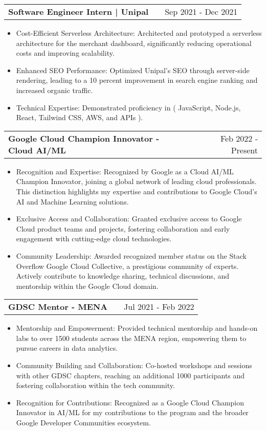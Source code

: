 \documentclass[a4paper,11pt]{article}
\makeatletter
\newenvironment{joblong}[2]
    {
    \begin{tabularx}{\linewidth}{@{}l X r@{}}
    \textbf{#1} & \hfill &  #2 \\[3.75pt]
    \end{tabularx}
    \begin{minipage}[t]{\linewidth}
    \begin{itemize}[nosep,after=\strut, leftmargin=1em, itemsep=3pt,label=--]
    }
    {
    \end{itemize}
    \end{minipage}    
    }
\makeatother
\begin{document}
\begin{joblong}{Software Engineer Intern | Unipal}{Sep 2021 - Dec 2021}
    \item Cost-Efficient Serverless Architecture: Architected and prototyped a serverless architecture for the merchant dashboard, significantly reducing operational costs and improving scalability.
    \item Enhanced SEO Performance: Optimized Unipal's SEO through server-side rendering, leading to a 10 percent improvement in search engine ranking and increased organic traffic.
    \item Technical Expertise: Demonstrated proficiency in ( JavaScript, Node.js, React, Tailwind CSS, AWS, and APIs ).

\end{joblong}

\begin{joblong}{Google Cloud Champion Innovator - Cloud AI/ML}{Feb 2022 - Present}
\item Recognition and Expertise: Recognized by Google as a Cloud AI/ML Champion Innovator, joining a global network of leading cloud professionals. This distinction highlights my expertise and contributions to Google Cloud's AI and Machine Learning solutions.
\item Exclusive Access and Collaboration: Granted exclusive access to Google Cloud product teams and projects, fostering collaboration and early engagement with cutting-edge cloud technologies.
\item Community Leadership: Awarded recognized member status on the Stack Overflow Google Cloud Collective, a prestigious community of experts. Actively contribute to knowledge sharing, technical discussions, and mentorship within the Google Cloud domain.

\end{joblong}

\begin{joblong}{GDSC Mentor - MENA}{Jul 2021 - Feb 2022}
\item Mentorship and Empowerment: Provided technical mentorship and hands-on labs to over 1500 students across the MENA region, empowering them to pursue careers in data analytics.
\item Community Building and Collaboration: Co-hosted workshops and sessions with other GDSC chapters, reaching an additional 1000 participants and fostering collaboration within the tech community.
\item Recognition for Contributions: Recognized as a Google Cloud Champion Innovator in AI/ML for my contributions to the program and the broader Google Developer Communities ecosystem.

\end{joblong}
\end{document}
